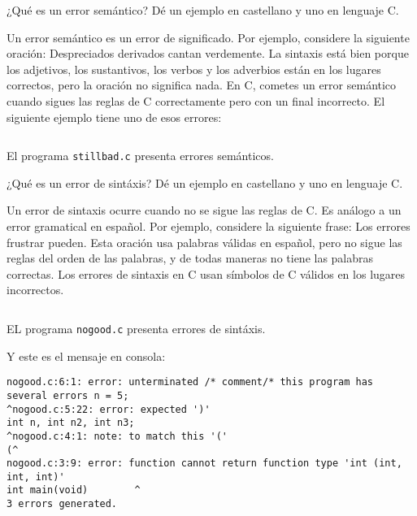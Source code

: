 \documentclass[spanish,addpoints,answers,a4paper]{exam}
\begin{document}
\begin{questions}

\question ¿Qué es un error semántico? Dé un ejemplo en castellano y uno en lenguaje C.

\begin{solution}
Un error semántico es un error de significado. Por ejemplo, considere la siguiente oración: Despreciados derivados cantan verdemente. La sintaxis está bien porque los adjetivos, los sustantivos, los verbos y los adverbios están en los lugares correctos, pero la oración no significa nada. En C, cometes un error semántico cuando sigues las reglas de C correctamente pero con un final incorrecto. El siguiente ejemplo tiene uno de esos errores:

\begin{listing}[H]
\footnotesize
\inputminted{c}{exercise1_1.c}
\caption{El programa \texttt{stillbad.c} presenta errores semánticos.}
\label{lst:1}
\end{listing}

\end{solution}

\question ¿Qué es un error de sintáxis? Dé un ejemplo en castellano y uno en lenguaje C.

\begin{solution}
Un error de sintaxis ocurre cuando no se sigue las reglas de C. Es análogo a un error gramatical en español. Por ejemplo, considere la siguiente frase: Los errores frustrar pueden. Esta oración usa palabras válidas en español, pero no sigue las reglas del orden de las palabras, y de todas maneras no tiene las palabras correctas. Los errores de sintaxis en C usan símbolos de C válidos en los lugares incorrectos.

\begin{listing}[H]
\footnotesize
\inputminted{c}{exercise1_2.c}
\caption{EL programa \texttt{nogood.c} presenta errores de sintáxis.}
\label{lst:2}
\end{listing}
Y este es el mensaje en consola:
\

{\footnotesize
\begin{verbatim}
nogood.c:6:1: error: unterminated /* comment/* this program has several errors n = 5;
^nogood.c:5:22: error: expected ')'
int n, int n2, int n3;
^nogood.c:4:1: note: to match this '('
(^
nogood.c:3:9: error: function cannot return function type 'int (int, int, int)'
int main(void)        ^
3 errors generated.
\end{verbatim}
}
\end{solution}


\end{questions}
\end{document}
